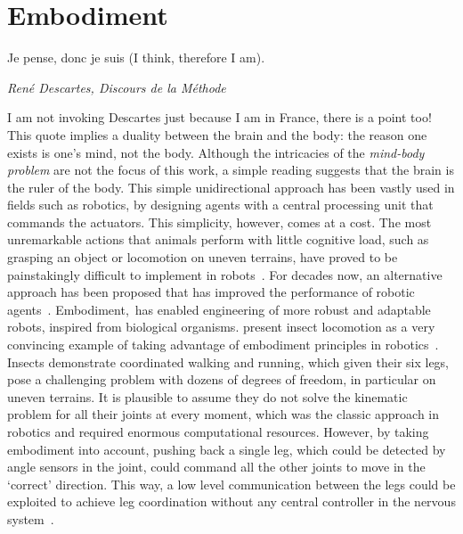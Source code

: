 \section{Embodiment}
\label{ch:intro:Embodiment}
{\singlespacing \epigraph{Je pense, donc je suis (I think, therefore I am).}
{\textit{ Ren\'{e} Descartes, Discours de la M\'{e}thode}}}
\noindent
I am not invoking Descartes just because I am in France, there is a point too!
This quote implies a duality between the brain and the body: the reason one exists is one's mind, not the body.
Although the intricacies of the \textit{mind-body problem} are not the focus of this work, a simple reading suggests that the brain is the ruler of the body.
This simple unidirectional approach has been vastly used in fields such as robotics, by designing agents with a central processing unit that commands the actuators.
This simplicity, however, comes at a cost.
The most unremarkable actions that animals perform with little cognitive load, such as grasping an object or locomotion on uneven terrains, have proved to be painstakingly difficult to implement in robots~\cite{Pfeifer2006Book}.
For decades now, an alternative approach has been proposed that has improved the performance of robotic agents~\cite{Brooks1991AI}.
Embodiment,\footnotemark\ has enabled engineering of more robust and adaptable robots, inspired from biological organisms.
\citeauthor{Pfeifer2007Sci} present insect locomotion as a very convincing example of taking advantage of embodiment principles in robotics~\cite{Pfeifer2007Sci}.
Insects demonstrate coordinated walking and running, which given their six legs, pose a challenging problem with dozens of degrees of freedom, in particular on uneven terrains.
It is plausible to assume they do not solve the kinematic problem for all their joints at every moment, which was the classic approach in robotics and required enormous computational resources.
However, by taking embodiment into account, pushing back a single leg, which could be detected by angle sensors in the joint, could command all the other joints to move in the `correct' direction.
This way, a low level communication between the legs could be exploited to achieve leg coordination without any central controller in the nervous system~\cite{Pfeifer2007Sci}.
